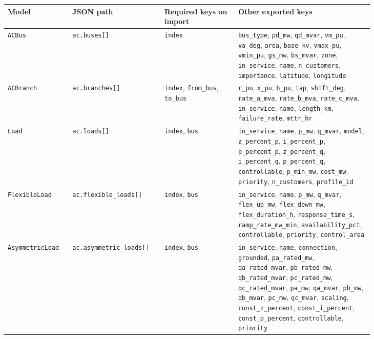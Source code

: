 \footnotesize
\begin{longtable}{L{0.14\linewidth}L{0.18\linewidth}L{0.18\linewidth}L{0.33\linewidth}}
\toprule
Model & JSON path & Required keys on import & Other exported keys \\
\midrule
\endhead
\texttt{ACBus} & \texttt{ac.buses[]} & \texttt{index} & \texttt{bus\_type}, \texttt{pd\_mw}, \texttt{qd\_mvar}, \texttt{vm\_pu}, \texttt{va\_deg}, \texttt{area}, \texttt{base\_kv}, \texttt{vmax\_pu}, \texttt{vmin\_pu}, \texttt{gs\_mw}, \texttt{bs\_mvar}, \texttt{zone}, \texttt{in\_service}, \texttt{name}, \texttt{n\_customers}, \texttt{importance}, \texttt{latitude}, \texttt{longitude} \\
\texttt{ACBranch} & \texttt{ac.branches[]} & \texttt{index}, \texttt{from\_bus}, \texttt{to\_bus} & \texttt{r\_pu}, \texttt{x\_pu}, \texttt{b\_pu}, \texttt{tap}, \texttt{shift\_deg}, \texttt{rate\_a\_mva}, \texttt{rate\_b\_mva}, \texttt{rate\_c\_mva}, \texttt{in\_service}, \texttt{name}, \texttt{length\_km}, \texttt{failure\_rate}, \texttt{mttr\_hr} \\
\texttt{Load} & \texttt{ac.loads[]} & \texttt{index}, \texttt{bus} & \texttt{in\_service}, \texttt{name}, \texttt{p\_mw}, \texttt{q\_mvar}, \texttt{model}, \texttt{z\_percent\_p}, \texttt{i\_percent\_p}, \texttt{p\_percent\_p}, \texttt{z\_percent\_q}, \texttt{i\_percent\_q}, \texttt{p\_percent\_q}, \texttt{controllable}, \texttt{p\_min\_mw}, \texttt{cost\_mw}, \texttt{priority}, \texttt{n\_customers}, \texttt{profile\_id} \\
\texttt{FlexibleLoad} & \texttt{ac.flexible\_loads[]} & \texttt{index}, \texttt{bus} & \texttt{in\_service}, \texttt{name}, \texttt{p\_mw}, \texttt{q\_mvar}, \texttt{flex\_up\_mw}, \texttt{flex\_down\_mw}, \texttt{flex\_duration\_h}, \texttt{response\_time\_s}, \texttt{ramp\_rate\_mw\_min}, \texttt{availability\_pct}, \texttt{controllable}, \texttt{priority}, \texttt{control\_area} \\
\texttt{AsymmetricLoad} & \texttt{ac.asymmetric\_loads[]} & \texttt{index}, \texttt{bus} & \texttt{in\_service}, \texttt{name}, \texttt{connection}, \texttt{grounded}, \texttt{pa\_rated\_mw}, \texttt{qa\_rated\_mvar}, \texttt{pb\_rated\_mw}, \texttt{qb\_rated\_mvar}, \texttt{pc\_rated\_mw}, \texttt{qc\_rated\_mvar}, \texttt{pa\_mw}, \texttt{qa\_mvar}, \texttt{pb\_mw}, \texttt{qb\_mvar}, \texttt{pc\_mw}, \texttt{qc\_mvar}, \texttt{scaling}, \texttt{const\_z\_percent}, \texttt{const\_i\_percent}, \texttt{const\_p\_percent}, \texttt{controllable}, \texttt{priority} \\

\end{longtable}

